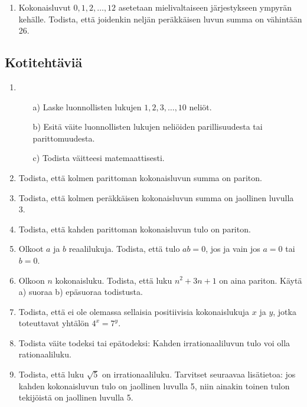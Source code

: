 \begin{enumerate}
\item Kokonaisluvut $0, 1, 2, \ldots, 12$ asetetaan
mielivaltaiseen järjestykseen ympyrän kehälle. Todista,
että joidenkin neljän peräkkäisen luvun summa on
vähintään 26.

\end{enumerate}

\subsection*{Kotitehtäviä}

\begin{enumerate}

\item
\begin{itemize}
\item[a)] Laske luonnollisten lukujen $1, 2, 3,\ldots,
10$ neliöt.
\item[b)] Esitä väite luonnollisten lukujen neliöiden
parillisuudesta tai parittomuudesta.
\item[c)] Todista väitteesi matemaattisesti.
\end{itemize}

\item Todista, että kolmen parittoman kokonaisluvun summa on pariton.

\item Todista, että kolmen peräkkäisen kokonaisluvun summa
on jaollinen luvulla 3.

\item Todista, että kahden parittoman kokonaisluvun tulo
on pariton.

\item Olkoot $a$ ja $b$ reaalilukuja. Todista, että tulo $ab = 0$, jos ja vain jos $a=0$ tai $b=0$.

\item Olkoon $n$ kokonaisluku. Todista, että luku $n^{2} + 3n + 1$ on aina pariton. Käytä a) suoraa b) epäsuoraa
todistusta.

\item Todista, että ei ole olemassa sellaisia
positiivisia kokonaislukuja $x$ ja $y$, jotka toteuttavat
yhtälön $4^{x} = 7^{y}$.

\item Todista väite todeksi tai epätodeksi: Kahden
irrationaaliluvun tulo voi olla rationaaliluku.

\item Todista, että luku $\sqrt{5}$ on irrationaaliluku.
Tarvitset seuraavaa lisätietoa: jos kahden kokonaisluvun
tulo on jaollinen luvulla 5, niin ainakin toinen tulon
tekijöistä on jaollinen luvulla 5.


\end{enumerate}
